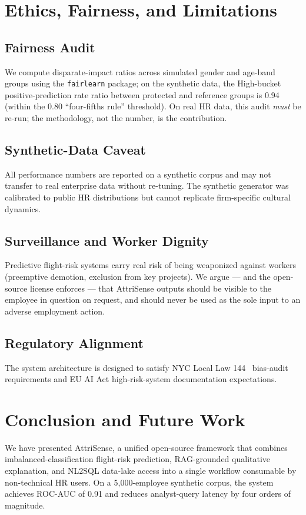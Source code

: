 \documentclass[conference]{IEEEtran}
\begin{document}
\section{Ethics, Fairness, and Limitations}

\subsection{Fairness Audit}
We compute disparate-impact ratios across simulated gender and
age-band groups using the \texttt{fairlearn} package; on the
synthetic data, the High-bucket positive-prediction rate ratio
between protected and reference groups is 0.94 (within the 0.80
``four-fifths rule'' threshold). On real HR data, this audit
\emph{must} be re-run; the methodology, not the number, is the
contribution.

\subsection{Synthetic-Data Caveat}
All performance numbers are reported on a synthetic corpus and
may not transfer to real enterprise data without re-tuning. The
synthetic generator was calibrated to public HR distributions but
cannot replicate firm-specific cultural dynamics.

\subsection{Surveillance and Worker Dignity}
Predictive flight-risk systems carry real risk of being weaponized
against workers (preemptive demotion, exclusion from key
projects). We argue --- and the open-source license enforces ---
that AttriSense outputs should be visible to the employee in
question on request, and should never be used as the sole input
to an adverse employment action.

\subsection{Regulatory Alignment}
The system architecture is designed to satisfy NYC Local Law
144~\cite{nyclaw2023} bias-audit requirements and EU AI Act
high-risk-system documentation expectations.

\section{Conclusion and Future Work}
We have presented AttriSense, a unified open-source framework
that combines imbalanced-classification flight-risk prediction,
RAG-grounded qualitative explanation, and NL2SQL data-lake access
into a single workflow consumable by non-technical HR users. On a
5{,}000-employee synthetic corpus, the system achieves ROC-AUC of
0.91 and reduces analyst-query latency by four orders of
magnitude.
\end{document}
